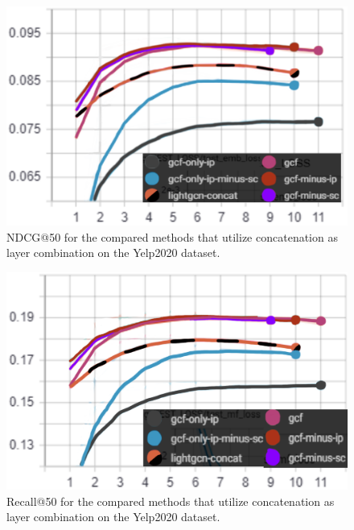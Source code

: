 \begin{figure}[]
    \includegraphics[width=\linewidth]{figures/gcf-ndcg-concat.png}
    \caption{NDCG@50 for the compared methods that utilize concatenation as layer combination on the Yelp2020 dataset.}
    \label{fig:GCF-NDCG-concat-ablation-study}
\end{figure}
\begin{figure}[]
    \includegraphics[width=\linewidth]{figures/gcf-concat-recall.png}
    \caption{Recall@50 for the compared methods that utilize concatenation as layer combination on the Yelp2020 dataset.}
    \label{fig:GCF-recall-concat-ablation-study}
\end{figure}
